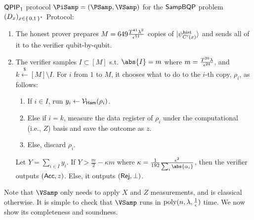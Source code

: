 \begin{protocol}{$\operatorname{\mathsf{QPIP}}_1$ protocol $\PiSamp=(\PSamp, \VSamp)$ for the $\operatorname{\mathsf{SampBQP}}$ problem $(D_x)_{x\in\set{0, 1}^*}$}
	Protocol:
	\begin{enumerate}
		\item\label{step:qpip1-state-gen} The honest prover prepares $M=649\frac{T^{41}\lambda^2}{\epsilon^{51}}$ copies of $\ket{\psi_{C'(x)}^{\mathrm{hist}}}$ and sends all of it to the verifier qubit-by-qubit.
		\item\label{step:qpip1-verify} The verifier samples $I\subset[M]$ s.t. $\abs{I}=m$ where $m=\frac{T^{20}\lambda}{\epsilon^{24}}$, and $k\xleftarrow{\$}[M]\setminus I$.
			For $i$ from $1$ to $M$, it chooses what to do to the $i$-th copy, $\rho_i$, as follows:
		\begin{enumerate}
			\item If $i\in I$, run $y_i\leftarrow\mathcal{V}_{\mathsf{Ham}}(\rho_i)$.
			\item Else if $i=k$, measure the data register 
			of $\rho_i$ under the computational (i.e., $Z$) basis and save the outcome as $z$.
			\item Else, discard $\rho_i$.
		\end{enumerate}
			Let $Y=\sum_{i\in I} y_i$. If $Y>\frac{m}{2}-\kappa m$ where $\kappa=\frac{1}{192}\frac{\eps^2}{\sum_i\abs{\alpha_i}}$, then the verifier outputs $(\mathsf{Acc}, z)$.
			Else, it outputs $(\mathsf{Rej}, \bot)$.
	\end{enumerate}
\end{protocol}

Note that $\VSamp$ only needs to apply $X$ and $Z$ measurements, and is classical otherwise.
It is simple to check that $\VSamp$ runs in $\operatorname*{\operatorname{poly}}(n, \lambda, \frac{1}{\epsilon})$ time.
We now show its completeness and soundness.


